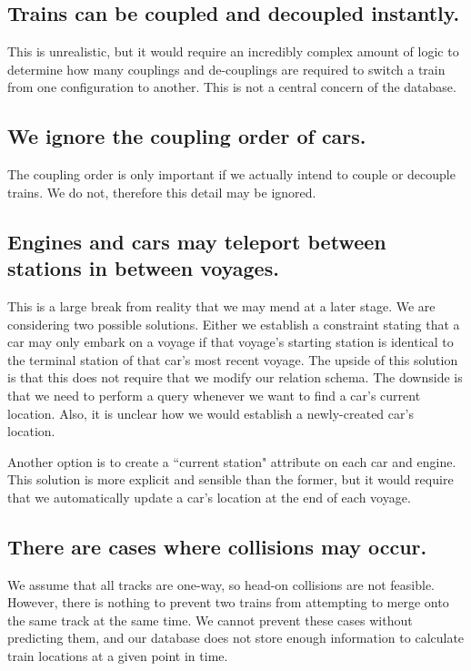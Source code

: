 \documentclass[a4paper]{article}
\begin{document}
\subsection*{Trains can be coupled and decoupled instantly.}
This is unrealistic, but it would require an incredibly complex amount of logic to determine how many couplings and de-couplings are required to switch a train from one configuration to another. This is not a central concern of the database. 

\subsection*{We ignore the coupling order of cars.}
The coupling order is only important if we actually intend to couple or decouple trains. We do not, therefore this detail may be ignored.

\subsection*{Engines and cars may teleport between stations in between voyages.}
This is a large break from reality that we may mend at a later stage. We are considering two possible solutions. Either we establish a constraint stating that a car may only embark on a voyage if that voyage’s starting station is identical to the terminal station of that car’s most recent voyage. The upside of this solution is that this does not require that we modify our relation schema. The downside is that we need to perform a query whenever we want to find a car’s current location. Also, it is unclear how we would establish a newly-created car’s location.

Another option is to create a ``current station" attribute on each car and engine. This solution is more explicit and sensible than the former, but it would require that we automatically update a car’s location at the end of each voyage. 

\subsection*{There are cases where collisions may occur.}
	We assume that all tracks are one-way, so head-on collisions are not feasible. However, there is nothing to prevent two trains from attempting to merge onto the same track at the same time. We cannot prevent these cases without predicting them, and our database does not store enough information to calculate train locations at a given point in time.
\end{document}
